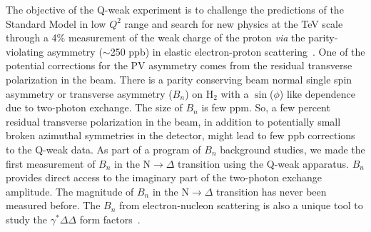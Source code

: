 The objective of the Q-weak experiment is to challenge the predictions of the Standard Model in low $Q^{2}$ range and search for new physics at the TeV scale through a 4\% measurement of the weak charge of the proton \textit{via} the parity-violating asymmetry ($\sim$250 ppb) in elastic electron-proton scattering~\cite{qweak_proposal_2007}.
One of the potential corrections for the PV asymmetry comes from the residual transverse polarization in the beam. 
There is a parity conserving beam normal single spin asymmetry or transverse asymmetry ($B_{n}$) on H$_{2}$ with a $\sin$($\phi$) like dependence due to two-photon exchange. The size of $B_{n}$ is few ppm. So, a few percent residual transverse polarization in the beam, in addition to potentially small broken azimuthal symmetries in the detector, might lead to few ppb corrections to the Q-weak data. As part of a program of $B_{n}$ background studies, we made the first measurement of $B_{n}$ in the N$\rightarrow\Delta$ transition using the Q-weak apparatus. %
$B_{n}$ provides direct access to the imaginary part of the two-photon exchange amplitude. The magnitude of $B_{n}$ in the N$\rightarrow\Delta$ transition has never been measured before. 
The $B_{n}$ from electron-nucleon scattering is also a unique tool to study the $\gamma^{*}\Delta\Delta$ form factors~\cite{Alexandrou:2009hs}. 

